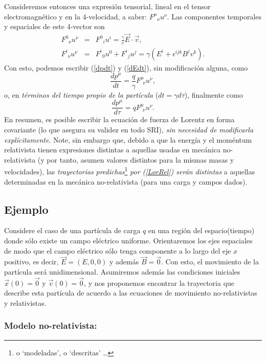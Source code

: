 Consideremos entonces una expresión tensorial, lineal en el tensor
electromagnético y en la 4-velocidad, a saber: $F^\mu{}_{\nu}u^\nu$. Las
componentes temporales y espaciales de este 4-vector son
\begin{eqnarray}
F^0{}_{\nu}u^\nu &=&F^0{}_{i}u^i=\frac{\gamma}{c}\vec{E}\cdot\vec{v} ,\\
F^i{}_{\nu}u^\nu &=&F^i{}_{0}u^0+F^i{}_{j}u^j=\gamma \left(
E^i+\epsilon^{ijk}B^j v^k\right) .
\end{eqnarray}
Con esto, podemos escribir  (\ref{dpdt}) y (\ref{dEdt}), sin modificación
alguna, como
\begin{equation}
\frac{dp^\mu }{dt}=\frac{q}{\gamma}F^\mu _{\ \ \nu}u^\nu ,
\end{equation}
o, en \textit{términos del tiempo propio de la partícula} ($dt=\gamma d\tau$),
finalmente como
\begin{equation}
\boxed{\frac{dp^\mu }{d\tau}=qF^\mu _{\ \ \nu}u^\nu .} \label{LorRel}
\end{equation}
En resumen, es posible escribir la ecuación de fuerza de Lorentz en forma
covariante (lo que asegura su validez en todo SRI), \textit{sin necesidad de
modificarla explícitamente}. Note, sin embargo que, debido a que la energía y el moméntum relativista tienen expresiones distintas a aquellas usadas en mecánica no-relativista (y por tanto, asumen valores distintos para la mismas masas y velocidades), las \textit{trayectorias} \textit{predichas}\footnote{o `modeladas', o `descritas' \dots} \textit{por (\ref{LorRel}) serán distintas} a aquellas determinadas en la mecánica no-relativista (para una carga y campos dados).

\subsection{Ejemplo}
Considere el caso de una partícula de carga $q$ en una región del espacio(tiempo) donde sólo existe un campo eléctrico uniforme. Orientaremos los ejes espaciales de modo que el campo eléctrico sólo tenga componente a lo largo del eje $x$ positivo, es decir, $\vec{E}=(E,0,0)$ y además $\vec{B}=\vec{0}$. Con esto, el movimiento de la partícula será unidimensional. Asumiremos además las condiciones iniciales $\vec{x}(0)=\vec{0}$ y $\vec{v}(0)=\vec{0}$, y nos proponemos
encontrar la trayectoria que describe esta partícula de acuerdo a las
ecuaciones de movimiento no-relativistas y relativistas.

\subsubsection{Modelo no-relativista:}

